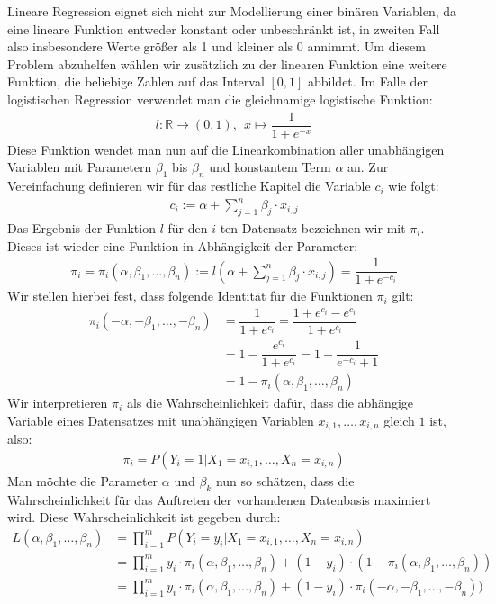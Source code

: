 Lineare Regression eignet sich nicht zur Modellierung einer binären Variablen, da eine lineare Funktion entweder konstant oder unbeschränkt ist, in zweiten Fall also insbesondere Werte größer als 1 und kleiner als 0 annimmt. Um diesem Problem abzuhelfen wählen wir zusätzlich zu der linearen Funktion eine weitere Funktion, die beliebige Zahlen auf das Interval $[0, 1]$ abbildet. Im Falle der logistischen Regression verwendet man die gleichnamige logistische Funktion:
\begin{align*}
    l: \mathbb{R} \rightarrow (0, 1),~~ x \mapsto \dfrac{1}{1+e^{-x}}
\end{align*}
Diese Funktion wendet man nun auf die Linearkombination aller unabhängigen Variablen mit Parametern $\beta_1$ bis $\beta_n$ und konstantem Term $\alpha$ an. Zur Vereinfachung definieren wir für das restliche Kapitel die Variable $c_i$ wie folgt:
\begin{align*}
    c_i := \alpha + \sum_{j=1}^n \beta_j \cdot x_{i, j}
\end{align*}
Das Ergebnis der Funktion $l$ für den $i$-ten Datensatz bezeichnen wir mit $\pi_i$. Dieses ist wieder eine Funktion in Abhängigkeit der Parameter:
\begin{align*}
    \pi_i = \pi_i(\alpha, \beta_1, \dots, \beta_n) := l \left( \alpha + \sum_{j=1}^n \beta_j \cdot x_{i, j} \right) = \dfrac{1}{1 + e^{-c_i}}
\end{align*}
Wir stellen hierbei fest, dass folgende Identität für die Funktionen $\pi_i$ gilt:
\begin{align*}
    \pi_i(- \alpha, - \beta_1, \dots, - \beta_n) &= \dfrac{1}{1 + e^{c_i}} = \dfrac{1 + e^{c_i} - e^{c_i}}{1 + e^{c_i}} \\
    &= 1 - \dfrac{e^{c_i}}{1 + e^{c_i}} = 1 - \dfrac{1}{e^{-c_i} + 1} \\
    &= 1 - \pi_i(\alpha, \beta_1, \dots, \beta_n)
\end{align*}
Wir interpretieren $\pi_i$ als die Wahrscheinlichkeit dafür, dass die abhängige Variable eines Datensatzes mit unabhängigen Variablen $x_{i, 1}, \dots, x_{i, n}$ gleich $1$ ist, also:
\begin{align*}
    \pi_i = P(Y_i = 1 | X_1 = x_{i, 1}, \dots, X_n = x_{i, n})
\end{align*}
Man möchte die Parameter $\alpha$ und $\beta_k$ nun so schätzen, dass die Wahrscheinlichkeit für das Auftreten der vorhandenen Datenbasis maximiert wird. Diese Wahrscheinlichkeit ist gegeben durch:
\begin{align*}
    L(\alpha, \beta_1, \dots, \beta_n) &= \prod_{i=1}^m P(Y_i = y_i | X_1 = x_{i, 1}, \dots, X_n = x_{i, n}) \\
    &= \prod_{i=1}^m y_i \cdot \pi_i(\alpha, \beta_1, \dots, \beta_n) + (1 - y_i) \cdot (1 - \pi_i(\alpha, \beta_1, \dots, \beta_n)) \\
    &= \prod_{i=1}^m y_i \cdot \pi_i(\alpha, \beta_1, \dots, \beta_n) + (1 - y_i) \cdot \pi_i(- \alpha, - \beta_1, \dots, - \beta_n))
\end{align*}
